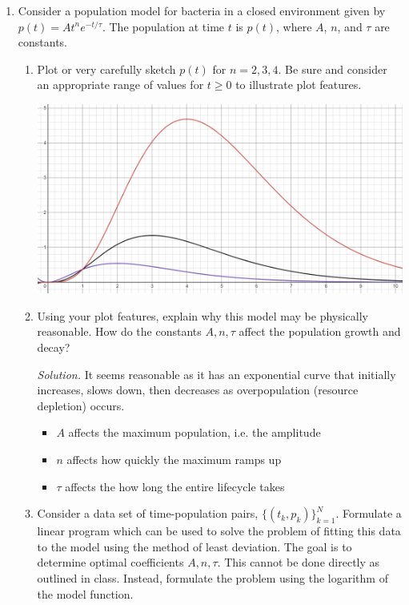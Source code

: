 \documentclass{homework}
\begin{document}
\begin{enumerate}
		\pagebreak
		
		\item Consider a population model for bacteria in a closed environment given by $p(t) = A t^n e^{-t/\tau}$. The population at time $t$ is $p(t)$, where $A$, $n$, and $\tau$ are constants.
		
		\begin{enumerate}
			\item Plot or very carefully sketch $p(t)$ for $n=2, 3, 4$. Be sure and consider an appropriate range of values for $t\ge 0$ to illustrate plot features.
			
			\begin{center}
				\includegraphics[width=\linewidth]{plot}
			\end{center}
			
		
			\item Using your plot features, explain why this model may be physically reasonable.  How do the constants  $A, n, \tau$ affect the population growth and decay?
			
			\vspace{1em} 
			\textit{Solution.} \quad It seems reasonable as it has an exponential curve that initially increases, slows down, then decreases as overpopulation (resource depletion) occurs. 
			
			\begin{itemize}
				\item $A$ affects the maximum population, i.e. the amplitude
				\item $n$ affects how quickly the maximum ramps up
				\item $\tau$ affects the how long the entire lifecycle takes
			\end{itemize}
			
			\item Consider a data set of time-population pairs, $\{(t_k, p_k)\}^N_{k=1}$. Formulate a linear program which can be used to solve the problem of fitting this data to the model using the method of least deviation.  The goal is to determine optimal coefficients $A, n, \tau$.  This cannot be done directly as outlined in class.  Instead, formulate the problem using the logarithm of the model function. 
			

\end{enumerate}
\end{enumerate}
\end{document}
